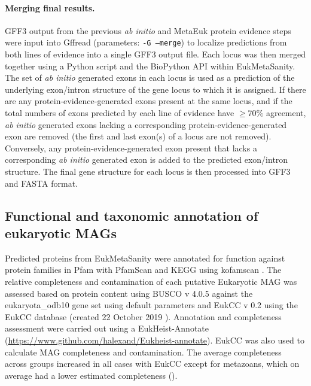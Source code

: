 \documentclass[12pt]{article}
\numberwithin{equation}{section}
\begin{document}
\paragraph{Merging final results.} GFF3 output from the previous \textit{ab initio} and MetaEuk protein evidence steps were input into Gffread \citep{Pertea2020} (parameters: \texttt{-G --merge}) to localize predictions from both lines of evidence into a single GFF3 output file.  Each locus was then merged together using a Python \citep{Python} script and the BioPython API \citep{BioPython} within EukMetaSanity. The set of \textit{ab initio} generated exons in each locus is used as a prediction of the underlying exon/intron structure of the gene locus to which it is assigned. If there are any protein-evidence-generated exons present at the same locus, and if the total numbers of exons predicted by each line of evidence have $\geq 70\%$ agreement, \textit{ab initio} generated exons lacking a corresponding protein-evidence-generated exon are removed (the first and last exon(s) of a locus are not removed). Conversely, any protein-evidence-generated exon present that lacks a corresponding \textit{ab initio} generated exon is added to the predicted exon/intron structure. The final gene structure for each locus is then processed into GFF3 and FASTA format.

\subsection*{Functional and taxonomic annotation of eukaryotic MAGs} 

Predicted proteins from EukMetaSanity were annotated for function against protein families in Pfam with PfamScan \citep{Finn2014Pfam} and KEGG using kofamscan \citep{Kanehisa_2019, Aramaki_2019}. The relative completeness and contamination  of each putative Eukaryotic MAG was assessed based on protein content using BUSCO v 4.0.5 against the eukaryota\_odb10 gene set using default parameters \citep{Simao2015BUSCO} and EukCC v 0.2 using the EukCC database (created 22 October 2019 \citep{Saary2020Estimating}). Annotation and completeness assessment were carried out using a EukHeist-Annotate (\url{https://www.github.com/halexand/Eukheist-annotate}). EukCC \citep{Saary2020Estimating} was also used to calculate MAG completeness and contamination. The average completeness across groups increased in all cases with EukCC except for metazoans, which on average had a lower estimated completeness (). 
\end{document}
